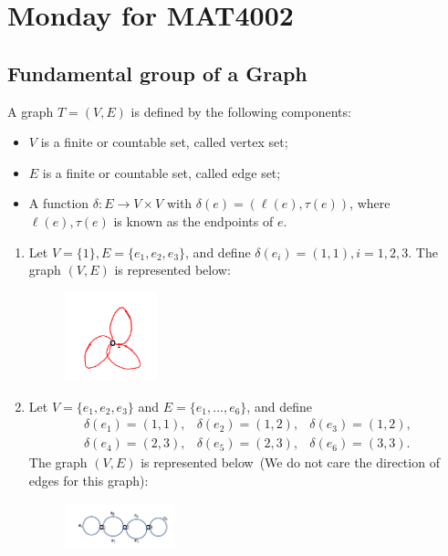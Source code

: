 \section{Monday for MAT4002}

\subsection{Fundamental group of a Graph}

\begin{definition}[Graph]
A graph $T=(V,E)$ is defined by the following components:
\begin{itemize}
\item
$V$ is a finite or countable set, called vertex set;
\item
$E$ is a finite or countable set, called edge set;
\item
A function $\delta:E\to V\times V$ with $\delta(e) = (\ell(e),\tau(e))$, where $\ell(e),\tau(e)$ is known as the endpoints of $e$.
\end{itemize}
\end{definition}
\begin{example}
\begin{enumerate}
\item
Let $V=\{1\}, E=\{e_1,e_2,e_3\}$, and define $\delta(e_i)=(1,1), i=1,2,3$.
The graph $(V,E)$ is represented below:
\begin{figure}[H]
\centering
\includegraphics[width=0.25\textwidth]{week14/f_22}
\end{figure}
\item
Let $V=\{e_1,e_2,e_3\}$ and $E=\{e_1,\dots,e_6\}$, and define 
\[
\begin{array}{lll}
\delta(e_1)=(1,1),&
\delta(e_2)=(1,2),&
\delta(e_3)=(1,2),\\
\delta(e_4)=(2,3),&
\delta(e_5)=(2,3),&
\delta(e_6)=(3,3).
\end{array}
\]
The graph $(V,E)$ is represented below~(We do not care the direction of edges for this graph):
\begin{figure}[H]
\centering
\includegraphics[width=0.3\textwidth]{week14/f_23}
\end{figure}
\end{enumerate}
\end{example}
